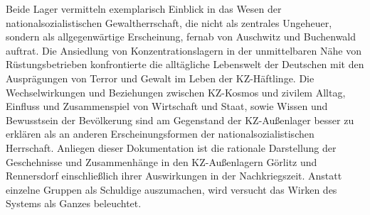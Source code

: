 Beide Lager vermitteln exemplarisch Einblick in das Wesen der nationalsozialistischen Gewaltherrschaft, die nicht als zentrales Ungeheuer, sondern als allgegenwärtige Erscheinung, fernab von Auschwitz und Buchenwald auftrat. Die Ansiedlung von Konzentrationslagern in der unmittelbaren Nähe von Rüstungsbetrieben konfrontierte die alltägliche Lebenswelt der Deutschen mit den Ausprägungen von Terror und Gewalt im Leben der KZ-Häftlinge. Die Wechselwirkungen und Beziehungen zwischen KZ-Kosmos und zivilem Alltag, Einfluss und Zusammenspiel von Wirtschaft und Staat, sowie Wissen und Bewusstsein der Bevölkerung sind am Gegenstand der KZ-Außenlager besser zu erklären als an anderen Erscheinungsformen der nationalsozialistischen Herrschaft. Anliegen dieser Dokumentation ist die rationale Darstellung der Geschehnisse und Zusammenhänge in den KZ-Außenlagern Görlitz und Rennersdorf einschließlich ihrer Auswirkungen in der Nachkriegszeit. Anstatt einzelne Gruppen als Schuldige auszumachen, wird versucht das Wirken des Systems als Ganzes beleuchtet.


